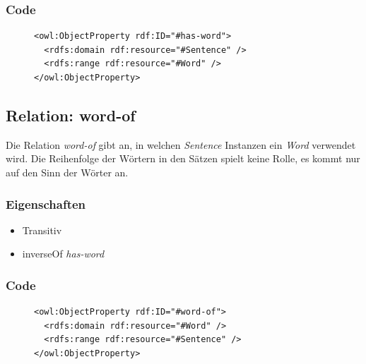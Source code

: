 \documentclass[
    11pt,
    latin1,
    a4paper,
    oneside
]{scrreprt}
\begin{document}
\subsubsection{Code} \label{sec:rel_hasword_code}

\begin{figure}[H]
 \lstset{language=XML}
 \begin{lstlisting}[label=owl:hasword,caption={Die Relation \emph{has-word} gibt an, welches Wort in einem Satz vorkommt}]
<owl:ObjectProperty rdf:ID="#has-word">
  <rdfs:domain rdf:resource="#Sentence" />
  <rdfs:range rdf:resource="#Word" />
</owl:ObjectProperty>
 \end{lstlisting}
\end{figure}


\subsection{Relation: word-of} \label{sec:rel_wordof}

Die Relation \emph{word-of} gibt an, in welchen \emph{Sentence} Instanzen ein \emph{Word} verwendet wird. Die Reihenfolge der W\"ortern in den S\"atzen spielt keine Rolle, es kommt nur auf den Sinn der W\"orter an.

\subsubsection{Eigenschaften} \label{sec:rel_wordof_settings}

\begin{itemize}
  \item Transitiv
  \item inverseOf \emph{has-word}
\end{itemize}

\subsubsection{Code} \label{sec:rel_wordof_code}

\begin{figure}[H]
 \lstset{language=XML}
 \begin{lstlisting}[label=owl:wordof,caption={Die Relation \emph{word-of} gibt an, in welchem Satz das Wort vorkommt}]
<owl:ObjectProperty rdf:ID="#word-of">
  <rdfs:domain rdf:resource="#Word" />
  <rdfs:range rdf:resource="#Sentence" />
</owl:ObjectProperty>
 \end{lstlisting}
\end{figure}
\end{document}

